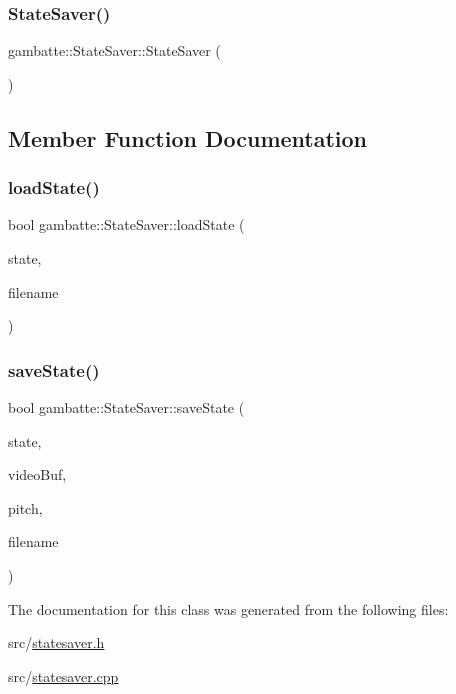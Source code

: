 \subsubsection{\texorpdfstring{State\+Saver()}{StateSaver()}}
{\footnotesize\ttfamily gambatte\+::\+State\+Saver\+::\+State\+Saver (\begin{DoxyParamCaption}{ }\end{DoxyParamCaption})\hspace{0.3cm}{\ttfamily [private]}}



\subsection{Member Function Documentation}
\mbox{\label{classgambatte_1_1StateSaver_a0abf1c65ad9d738043fcc8ef819d4bef}} 
\subsubsection{\texorpdfstring{load\+State()}{loadState()}}
{\footnotesize\ttfamily bool gambatte\+::\+State\+Saver\+::load\+State (\begin{DoxyParamCaption}\item[{\hyperlink{structgambatte_1_1SaveState}{Save\+State} \&}]{state,  }\item[{std\+::string const \&}]{filename }\end{DoxyParamCaption})\hspace{0.3cm}{\ttfamily [static]}}

\mbox{\label{classgambatte_1_1StateSaver_abbc44cde3c1406a300656c57574453e8}} 
\subsubsection{\texorpdfstring{save\+State()}{saveState()}}
{\footnotesize\ttfamily bool gambatte\+::\+State\+Saver\+::save\+State (\begin{DoxyParamCaption}\item[{\hyperlink{structgambatte_1_1SaveState}{Save\+State} const \&}]{state,  }\item[{\hyperlink{namespacegambatte_a0639f09fccfbbd5a8e0796318768e370}{uint\+\_\+least32\+\_\+t} const $\ast$}]{video\+Buf,  }\item[{std\+::ptrdiff\+\_\+t}]{pitch,  }\item[{std\+::string const \&}]{filename }\end{DoxyParamCaption})\hspace{0.3cm}{\ttfamily [static]}}



The documentation for this class was generated from the following files\+:\begin{DoxyCompactItemize}
\item 
src/\hyperlink{statesaver_8h}{statesaver.\+h}\item 
src/\hyperlink{statesaver_8cpp}{statesaver.\+cpp}\end{DoxyCompactItemize}
